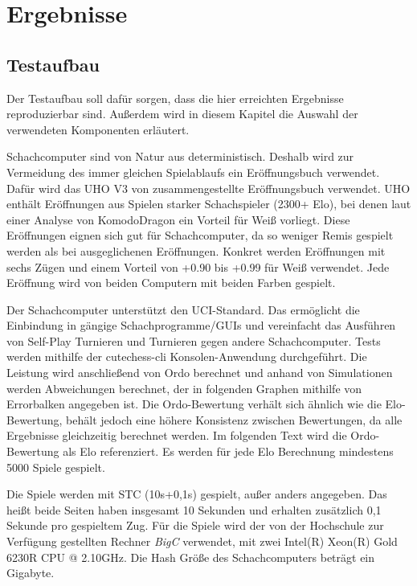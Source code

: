 \chapter{Ergebnisse}
\label{chap:Ergebnisse}

\section{Testaufbau}

Der Testaufbau soll dafür sorgen, dass die hier erreichten Ergebnisse reproduzierbar sind. Außerdem wird in diesem Kapitel die Auswahl der verwendeten Komponenten erläutert.

Schachcomputer sind von Natur aus deterministisch. Deshalb wird zur Vermeidung des immer gleichen Spielablaufs ein Eröffnungsbuch verwendet. Dafür wird das \ac{UHO} V3 von \citeauthor{Pohl2021} \cite{Pohl2021} zusammengestellte Eröffnungsbuch verwendet. \ac{UHO} enthält Eröffnungen aus Spielen starker Schachspieler (2300+ Elo), bei denen laut einer Analyse von KomodoDragon \cite{KomodoDragon} ein Vorteil für Weiß vorliegt. Diese Eröffnungen eignen sich gut für Schachcomputer, da so weniger Remis gespielt werden als bei ausgeglichenen Eröffnungen. Konkret werden Eröffnungen mit sechs Zügen und einem Vorteil von +0.90 bis +0.99 für Weiß verwendet. Jede Eröffnung wird von beiden Computern mit beiden Farben gespielt.

Der Schachcomputer unterstützt den \ac{UCI}-Standard. Das ermöglicht die Einbindung in gängige Schachprogramme/GUIs und vereinfacht das Ausführen von Self-Play Turnieren und Turnieren gegen andere Schachcomputer. Tests werden mithilfe der cutechess-cli \cite{CutechessRepo} Konsolen-Anwendung durchgeführt. Die Leistung wird anschließend von Ordo \cite{OrdoRepo} berechnet und anhand von Simulationen werden Abweichungen berechnet, der in folgenden Graphen mithilfe von Errorbalken angegeben ist. Die Ordo-Bewertung verhält sich ähnlich wie die Elo-Bewertung, behält jedoch eine höhere Konsistenz zwischen Bewertungen, da alle Ergebnisse gleichzeitig berechnet werden. Im folgenden Text wird die Ordo-Bewertung als Elo referenziert. Es werden für jede Elo Berechnung mindestens 5000 Spiele gespielt.

Die Spiele werden mit \ac{STC} (10s+0,1s) gespielt, außer anders angegeben. Das heißt beide Seiten haben insgesamt 10 Sekunden und erhalten zusätzlich 0,1 Sekunde pro gespieltem Zug. Für die Spiele wird der von der Hochschule zur Verfügung gestellten Rechner \emph{BigC} verwendet, mit zwei Intel(R) Xeon(R) Gold 6230R CPU @ 2.10GHz. Die Hash Größe des Schachcomputers beträgt ein Gigabyte.

